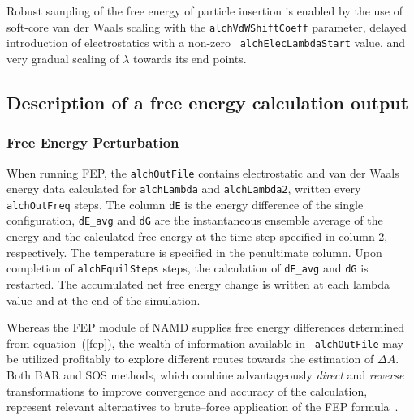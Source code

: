 Robust
sampling of the free energy of particle insertion is enabled by the use of
soft-core van der Waals scaling with the {\tt alchVdWShiftCoeff} parameter,
delayed introduction of electrostatics with a non-zero {\tt
alchElecLambdaStart} value, and very gradual scaling of $\lambda$ towards its
end points.



\subsection{Description of a free energy calculation output }


\subsubsection{Free Energy Perturbation }


When running FEP, the {\tt alchOutFile} contains electrostatic and van der Waals energy
data calculated for {\tt alchLambda} and {\tt alchLambda2}, written every
{\tt alchOutFreq} steps. The column {\tt dE} is the energy
difference of the single configuration, {\tt dE\_avg} and {\tt dG}
are the instantaneous ensemble average of the energy and the calculated
free energy at the time step specified in column 2, respectively.
The temperature is specified in the penultimate column. Upon completion
of {\tt alchEquilSteps} steps, the calculation of {\tt dE\_avg} and
{\tt dG} is restarted. The accumulated net free energy change is written
at each lambda value and at the end of the simulation.


Whereas the FEP module of NAMD supplies free energy differences determined from
equation~({\ref{fep}}), the wealth of information available in {\tt
alchOutFile} may be utilized profitably to explore different routes towards the
estimation of $\Delta A$. Both BAR and SOS methods, which combine
advantageously \emph{direct} and \emph{reverse} transformations to improve
convergence and accuracy of the calculation, represent relevant alternatives to
brute--force application of the FEP formula~\cite{Lu2004}.



